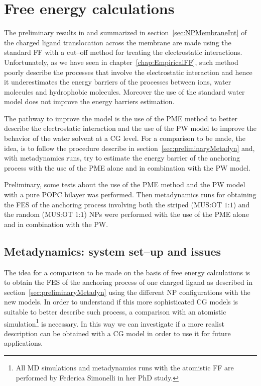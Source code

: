 \chapter{Free energy calculations}
The preliminary results in \cite{ourPaper} and summarized in section~\ref{sec:NPMembraneInt} of the charged ligand translocation across the membrane are made using the standard \martini \ac{FF} with a cut--off method for treating the electrostatic interactions. Unfortunately, as we have seen in chapter~\ref{chap:EmpiricalFF}, such method poorly describe the processes that involve the electrostatic interaction and hence it underestimates the energy barriers of the processes between ions, water molecules and hydrophobic molecules. Moreover the use of the standard \martini water model does not improve the energy barriers estimation.

The pathway to improve the model is the use of the \ac{PME} method to better describe the electrostatic interaction and the use of the \ac{PW} model to improve the behavior of the water solvent at a \ac{CG} level. For a comparison to be made, the idea, is to follow the procedure describe in section~\ref{sec:preliminaryMetadyn} and, with metadynamics runs, try to estimate the energy barrier of the anchoring process with the use of the \ac{PME} alone and in combination with the \ac{PW} model. 

Preliminary, some tests about the use of the \ac{PME} method and the \ac{PW} model with a pure \ac{POPC} bilayer was performed. Then metadynamics runs for obtaining the \ac{FES} of the anchoring process involving both the striped (\ac{MUS}:\ac{OT} $1$:$1$) and the random (\ac{MUS}:\ac{OT} $1$:$1$) \acp{NP} were performed with the use of the \ac{PME} alone and in combination with the \ac{PW}. 

\section{Metadynamics: system set--up and issues}
The idea for a comparison to be made on the basis of free energy calculations is to obtain the \ac{FES} of the anchoring process of one charged ligand as described in section~\ref{sec:preliminaryMetadyn} using the different \ac{NP} configurations with the new \martini models. In order to understand if this more sophisticated \ac{CG} models is suitable to better describe such process, a comparison with an atomistic simulation\footnote{All \acs{MD} simulations and metadynamics runs with the atomistic \ac{FF} are performed by Federica Simonelli in her PhD study.} is necessary. In this way we can investigate if a more realist description can be obtained with a \ac{CG} model in order to use it for future applications.

